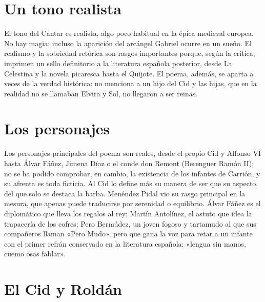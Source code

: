 \documentclass{book}
\begin{document}

\section{Un tono realista}

El tono del Cantar es realista, algo poco habitual en la épica medieval europea. No hay magia: incluso la aparición del arcángel Gabriel ocurre en un sueño. El realismo y la sobriedad retórica son rasgos importantes porque, según la crítica, imprimen un sello definitorio a la literatura española posterior, desde La Celestina y la novela picaresca hasta el Quijote. El poema, además, se aparta a veces de la verdad histórica: no menciona a un hijo del Cid y las hijas, que en la realidad no se llamaban Elvira y Sol, no llegaron a ser reinas.


\section{Los personajes}

Los personajes principales del poema son reales, desde el propio Cid y Alfonso VI hasta Álvar Fáñez, Jimena Díaz o el conde don Remont (Berenguer Ramón II); no se ha podido comprobar, en cambio, la existencia de los infantes de Carrión, y su afrenta es toda ficticia. Al Cid lo define más su manera de ser que su aspecto, del que solo se destaca la barba. Menéndez Pidal vio su rasgo principal en la mesura, que apenas puede traducirse por serenidad o equilibrio. Álvar Fáñez es el diplomático que lleva los regalos al rey; Martín Antolínez, el astuto que idea la trapacería de los cofres; Pero Bermúdez, un joven fogoso y tartamudo al que sus compañeros llaman «Pero Mudo», pero que gana la voz para retar a un infante con el primer refrán conservado en la literatura española: «lengua sin manos, cuemo osas fablar».


\section{El Cid y Roldán}
\end{document}
